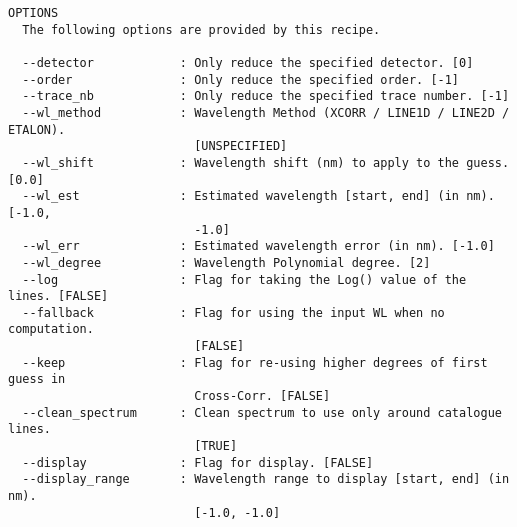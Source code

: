 \begin{verbatim}
OPTIONS
  The following options are provided by this recipe.

  --detector            : Only reduce the specified detector. [0]
  --order               : Only reduce the specified order. [-1]
  --trace_nb            : Only reduce the specified trace number. [-1]
  --wl_method           : Wavelength Method (XCORR / LINE1D / LINE2D / ETALON).
                          [UNSPECIFIED]
  --wl_shift            : Wavelength shift (nm) to apply to the guess. [0.0]
  --wl_est              : Estimated wavelength [start, end] (in nm). [-1.0,
                          -1.0]
  --wl_err              : Estimated wavelength error (in nm). [-1.0]
  --wl_degree           : Wavelength Polynomial degree. [2]
  --log                 : Flag for taking the Log() value of the lines. [FALSE]
  --fallback            : Flag for using the input WL when no computation.
                          [FALSE]
  --keep                : Flag for re-using higher degrees of first guess in
                          Cross-Corr. [FALSE]
  --clean_spectrum      : Clean spectrum to use only around catalogue lines.
                          [TRUE]
  --display             : Flag for display. [FALSE]
  --display_range       : Wavelength range to display [start, end] (in nm).
                          [-1.0, -1.0]

\end{verbatim}
